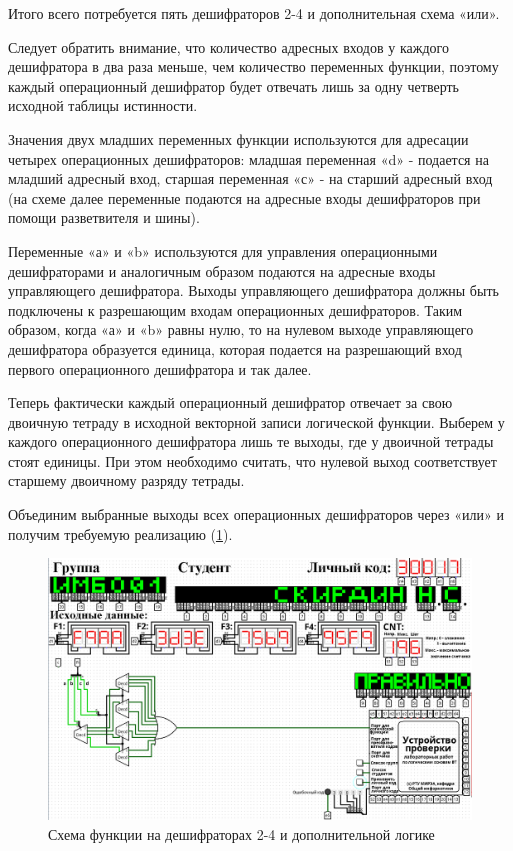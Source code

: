 \documentclass[14pt, a4paper]{extreport}
\begin{document}
Итого всего потребуется пять дешифраторов 2-4 и дополнительная схема
«или».

Следует обратить внимание, что количество адресных входов у каждого дешифратора в два раза меньше, чем количество переменных функции, поэтому каждый операционный дешифратор будет отвечать лишь за одну четверть исходной таблицы истинности.

Значения двух младших переменных функции используются для адресации четырех операционных дешифраторов: младшая переменная «d» - подается на младший адресный вход, старшая переменная «с» - на старший адресный вход (на схеме далее переменные подаются на адресные входы дешифраторов при помощи разветвителя и шины).

Переменные «а» и «b» используются для управления операционными дешифраторами и аналогичным образом подаются на адресные входы управляющего дешифратора. Выходы управляющего дешифратора должны быть подключены к разрешающим входам операционных дешифраторов. Таким образом, когда «а» и «b» равны нулю, то на нулевом выходе управляющего дешифратора образуется единица, которая подается на разрешающий вход первого операционного дешифратора и так далее.

Теперь фактически каждый операционный дешифратор отвечает за свою двоичную тетраду в исходной векторной записи логической функции. Выберем у каждого операционного дешифратора лишь те выходы, где у двоичной тетрады стоят единицы. При этом необходимо считать, что нулевой выход соответствует старшему двоичному разряду тетрады.

Объединим выбранные выходы всех операционных дешифраторов через «или» и получим требуемую реализацию (\cref{fig:decoder-2-4}).

\begin{figure}[H]
	\caption{Схема функции на дешифраторах 2-4 и дополнительной логике}
	\label{fig:decoder-2-4}
	\includegraphics[width=\textwidth]{decoder-2-4}
\end{figure}
\end{document}
